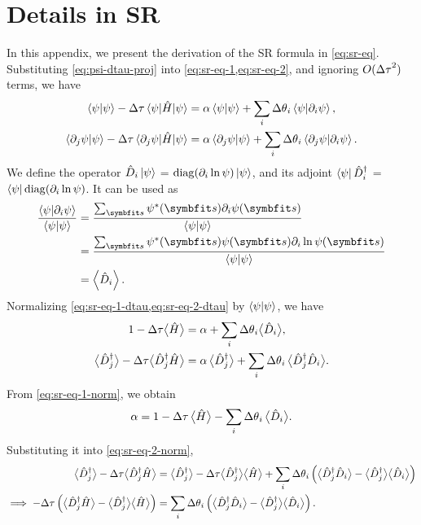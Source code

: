 \chapter{Details in SR}
\label{append:sr}

In this appendix, we present the derivation of the SR formula in \cref{eq:sr-eq}. Substituting \cref{eq:psi-dtau-proj} into \cref{eq:sr-eq-1,eq:sr-eq-2}, and ignoring $O({\Delta \tau}^2)$ terms, we have
\begin{align}
\ip{\psi} - \dta \ev{\hat{H}}{\psi} &= \alpha \ip{\psi} + \sum_i \dth_i \ip{\psi}{\pp_i \psi}, \label{eq:sr-eq-1-dtau} \\
\ip{\pp_j \psi}{\psi} - \dta \mel{\pp_j \psi}{\hat{H}}{\psi} &= \alpha \ip{\pp_j \psi}{\psi} + \sum_i \dth_i \ip{\pp_j \psi}{\pp_i \psi}. \label{eq:sr-eq-2-dtau}
\end{align}
We define the operator $\hat{D}_i \ket{\psi}$ = $\mathrm{diag}(\partial_i \ln \psi) \ket{\psi}$, and its adjoint $\bra{\psi} \hat{D}^\dagger_i$ = $\bra{\psi} \mathrm{diag}(\partial_i \ln \psi)$. It can be used as
\begin{align}
\fpsps{\ip{\psi}{\pp_i \psi}}
&= \fpsps{\sum_\vs \psi^*(\vs) \pp_i \psi(\vs)} \\
&= \fpsps{\sum_\vs \psi^*(\vs) \psi(\vs) \pp_i \ln \psi(\vs)} \\
&= \ev{\hat{D}_i}.
\end{align}
Normalizing \cref{eq:sr-eq-1-dtau,eq:sr-eq-2-dtau} by $\ip{\psi}$, we have
\begin{align}
1 - {\Delta \tau} \big\langle \hat{H} \big\rangle &= \alpha + \sum_i {\Delta \theta}_i \big\langle \hat{D}_i \big\rangle, \label{eq:sr-eq-1-norm} \\
\big\langle \hat{D}^\dagger_j \big\rangle - {\Delta \tau} \big\langle \hat{D}^\dagger_j \hat{H} \big\rangle &= \alpha\,\big\langle \hat{D}^\dagger_j \big\rangle + \sum_i {\Delta \theta}_i\,\big\langle \hat{D}^\dagger_j \hat{D}_i \big\rangle. \label{eq:sr-eq-2-norm}
\end{align}
From \cref{eq:sr-eq-1-norm}, we obtain
\begin{equation}
\alpha = 1 - {\Delta \tau}\,\big\langle \hat{H} \big\rangle - \sum_i {\Delta \theta}_i\,\big\langle \hat{D}_i \big\rangle.
\end{equation}
Substituting it into \cref{eq:sr-eq-2-norm},
\begin{align}
\big\langle \hat{D}^\dagger_j \big\rangle - {\Delta \tau} \big\langle \hat{D}^\dagger_j \hat{H} \big\rangle
&= \big\langle \hat{D}^\dagger_j \big\rangle
- {\Delta \tau} \big\langle \hat{D}^\dagger_j \big\rangle \big\langle \hat{H} \big\rangle
+ \sum_i {\Delta \theta}_i \left( \big\langle \hat{D}^\dagger_j \hat{D}_i \big\rangle - \big\langle \hat{D}^\dagger_j \big\rangle \big\langle \hat{D}_i \big\rangle \right) \\
\implies
-{\Delta \tau} \left( \big\langle \hat{D}^\dagger_j \hat{H} \big\rangle - \big\langle \hat{D}^\dagger_j \big\rangle \big\langle \hat{H} \big\rangle \right)
&= \sum_i {\Delta \theta}_i \left( \big\langle \hat{D}^\dagger_j \hat{D}_i \big\rangle - \big\langle \hat{D}^\dagger_j \big\rangle \big\langle \hat{D}_i \big\rangle \right).
\end{align}
